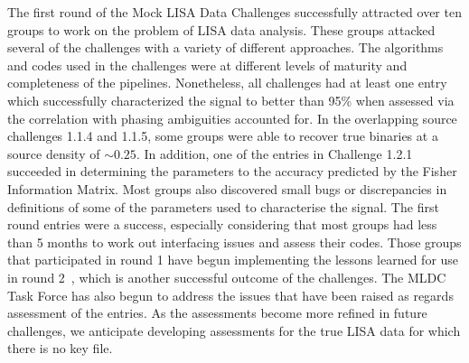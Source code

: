 \documentclass[12pt]{iopart}
\begin{document}
The first round of the Mock LISA Data Challenges successfully attracted over ten groups to work on the problem of LISA data analysis. These groups attacked several of the challenges with a variety of different approaches. The algorithms and codes used in the challenges were at different levels of maturity and completeness of the pipelines. Nonetheless, all challenges had at least one entry which successfully characterized the signal to better than 95\% when assessed via the correlation with phasing ambiguities accounted for. In the overlapping source challenges 1.1.4 and 1.1.5, some groups were able to recover true binaries at a source density of $\sim 0.25$. In addition, one of the entries in Challenge 1.2.1 succeeded in determining the parameters to the accuracy predicted by the Fisher Information Matrix. Most groups also discovered small bugs or discrepancies in definitions of some of the parameters used to characterise the signal. The first round entries were a success, especially considering that most groups had less than 5 months to work out interfacing issues and assess their codes. Those groups that participated in round 1 have begun implementing the lessons learned for use in round 2~\cite{MLDC2doc}, which is another successful outcome of the challenges. The MLDC Task Force has also begun to address the issues that have been raised as regards assessment of the entries. As the assessments become more refined in future challenges, we anticipate developing assessments for the true LISA data for which there is no key file.
\end{document}
